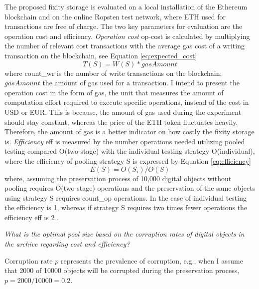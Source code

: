 The proposed fixity storage is evaluated on a local installation of the Ethereum blockchain and on the online Ropsten test network, where ETH used for transactions are free of charge.
The two key parameters for evaluation are the operation cost and efficiency. 
\textit{Operation cost} \acrshort{op-cost} is calculated by multiplying the number of relevant cost transactions with the average gas cost of a writing transaction on the blockchain, see Equation \ref{eq:expected_cost}
\begin{equation}\label{eq:expected_cost}
    T(S) = W(S) * gasAmount
\end{equation}
where \acrshort{count_wr} is the number of write transactions on the blockchain; $gasAmount$ the amount of gas used for a transaction.
I intend to present the operation cost in the form of gas, the unit that measures the amount of computation effort required to execute specific operations, instead of the cost in USD or EUR. This is because, the amount of gas used during the experiment should stay constant, whereas the price of the ETH token fluctuates heavily. Therefore, the amount of gas is a better indicator on how costly the fixity storage is.
\textit{Efficiency} \acrshort{eff} is measured by the number operations needed utilizing pooled testing compared O(\acrshort{two-stage}) with the individual testing strategy O(\acrshort{individual}), where the efficiency of pooling strategy S is expressed by Equation \ref{eq:efficiency}
\begin{equation}\label{eq:efficiency}
    E(S) = O(S_{i})/O(S)
\end{equation}
where, assuming the preservation process of 10,000 digital objects without pooling requires O(\acrshort{two-stage}) operations and the preservation of the same objects using strategy S requires \acrshort{count_op} operations. In the case of individual testing the efficiency is 1, whereas if strategy S requires two times fewer operations the efficiency \acrshort{eff} is 2 \cite[4]{vzilinskas2021pooled}.

\textit{What is the optimal pool size based on the corruption rates of digital objects in the archive regarding cost and efficiency?}

Corruption rate $p$ represents the prevalence of corruption, e.g., when I assume that 2000 of 10000 objects will be corrupted during the preservation process, $p = 2000/10000 = 0.2$. 

